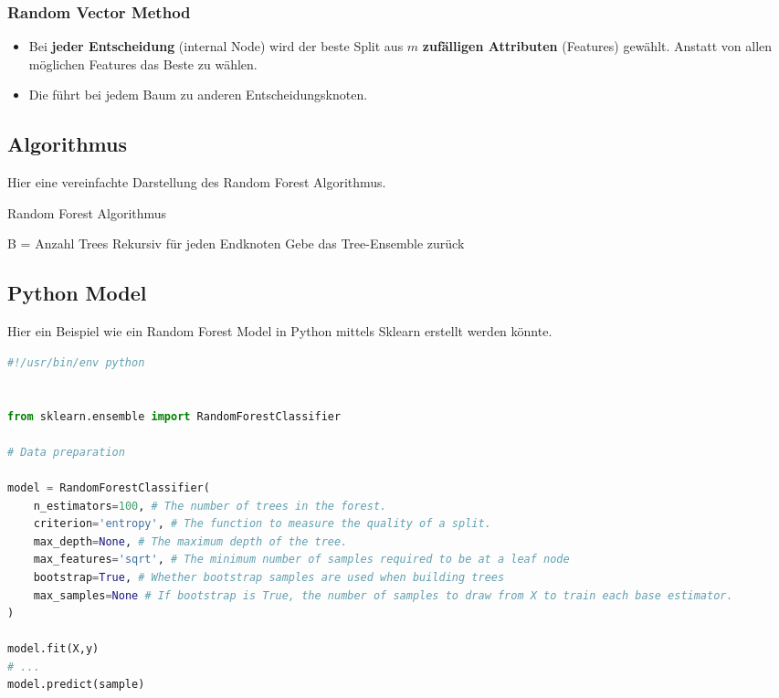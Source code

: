 \subsubsection{Random Vector Method}

\begin{itemize}
	\item Bei \textbf{jeder Entscheidung} (internal Node) wird der beste Split aus $m$ \textbf{zufälligen Attributen} (Features) gewählt. Anstatt von allen möglichen Features das Beste zu wählen.
	\item Die führt bei jedem Baum zu anderen Entscheidungsknoten.
\end{itemize}




\newpage
\subsection{Algorithmus}
Hier eine vereinfachte Darstellung des Random Forest Algorithmus.\\

\begin{algorithm}
	\caption{Random Forest Algorithmus}
	\begin{algorithmic} 
	\Comment B = Anzahl Trees
	\Repeat
	\Comment Rekursiv für jeden Endknoten
	\EndFor
	\Return Gebe das Tree-Ensemble zurück
	\end{algorithmic}
\end{algorithm}


\subsection{Python Model}

Hier ein Beispiel wie ein Random Forest Model in Python mittels Sklearn erstellt werden könnte. \\

\begin{lstlisting}[language=Python]
#!/usr/bin/env python


from sklearn.ensemble import RandomForestClassifier

# Data preparation

model = RandomForestClassifier(
    n_estimators=100, # The number of trees in the forest.
    criterion='entropy', # The function to measure the quality of a split. 
    max_depth=None, # The maximum depth of the tree.
    max_features='sqrt', # The minimum number of samples required to be at a leaf node
    bootstrap=True, # Whether bootstrap samples are used when building trees
    max_samples=None # If bootstrap is True, the number of samples to draw from X to train each base estimator.
)

model.fit(X,y)
# ...
model.predict(sample)

\end{lstlisting}




